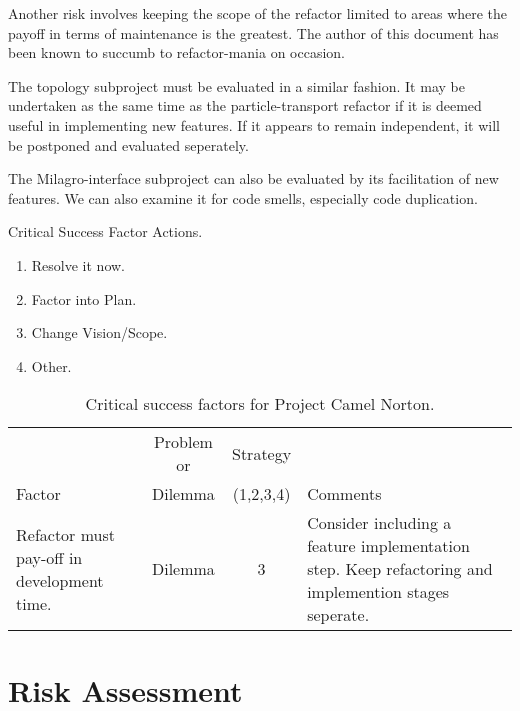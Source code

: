 \documentclass[11pt]{nmemo}
\begin{document}
Another risk involves keeping the scope of the refactor limited to
areas where the payoff in terms of maintenance is the greatest. The
author of this document has been known to succumb to refactor-mania on
occasion. 

The topology subproject must be evaluated in a similar fashion. It may
be undertaken as the same time as the particle-transport refactor if
it is deemed useful in implementing new features. If it appears to
remain independent, it will be postponed and evaluated seperately.

The Milagro-interface subproject can also be evaluated by its
facilitation of new features. We can also examine it for code smells,
especially code duplication.

\begin{table}[ht]
  \caption{Critical Success Factor Actions.}
    \begin{enumerate}
    \item Resolve it now.
    \item Factor into Plan.
    \item Change Vision/Scope.
    \item Other.
    \end{enumerate}
\end{table}

\begin{table}[ht]
  \begin{center}
    \caption{Critical success factors for Project Camel Norton.}
    \label{tab:critical-success}
    \begin{tabular}{|p{4.5cm}|c|c|p{4.5cm}|} 
    \hline
                       & Problem or & Strategy  &          \\
    Factor             &  Dilemma   & (1,2,3,4) & Comments \\ 
    \hline\hline
    Refactor must pay-off in development time.
    & Dilemma & 3 
    & Consider including a feature implementation step. Keep
    refactoring and implemention stages seperate. \\ 
    \hline
    \end{tabular}
  \end{center}
\end{table}


\newpage
\section*{Risk Assessment}
\end{document}
